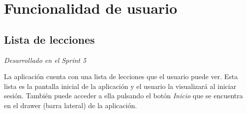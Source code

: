 \newpage

\section{Funcionalidad de usuario}
\label{sec:funcionalidad_usuario}


\subsection{Lista de lecciones}
\textit{Desarrollado en el Sprint 5}
\label{sec:lista_lecciones}

La aplicación cuenta con una lista de lecciones que el usuario puede ver. Esta lista es la pantalla inicial de la aplicación y el usuario 
la visualizará al iniciar sesión. También puede acceder a ella pulsando el botón \textit{Inicio} que se encuentra en el drawer (barra lateral) de la aplicación.


